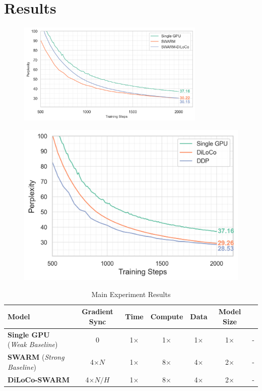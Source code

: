 \documentclass{article}
\begin{document}
\section{Results}

\begin{figure}[t!]
  \centering
  \includegraphics[width=0.8\textwidth]{figures/experiment1.png}
  \caption{}
  \label{fig:experiment1}
\end{figure}

\begin{figure}[t!]
  \centering
  \includegraphics[width=\linewidth]{figures/experiment2.png}
  \caption{}
  \label{fig:experiment2}
\end{figure}


\begin{table}[t!]
  \centering
  \begin{tabular}{l|cccccc}
  \toprule
  Model & Gradient Sync & Time & Compute & Data & Model Size \\
  \midrule
  \textbf{Single GPU} (\textit{Weak Baseline}) & 0 & 1$\times$ & 1$\times$ & 1$\times$ & 1$\times$ & - \\
  \textbf{SWARM} (\textit{Strong Baseline}) & 4$\times N$ & 1$\times$  & 8$\times$ & 4$\times$ & 2$\times$ & - \\
  \textbf{DiLoCo-SWARM} & 4$\times N/H$ & 1$\times$ & 8$\times$ & 4$\times$ & 2$\times$ & - \\
  \bottomrule
  \end{tabular}
  \caption{Main Experiment Results}
  \label{tab:main-results}
\end{table}
\end{document}
